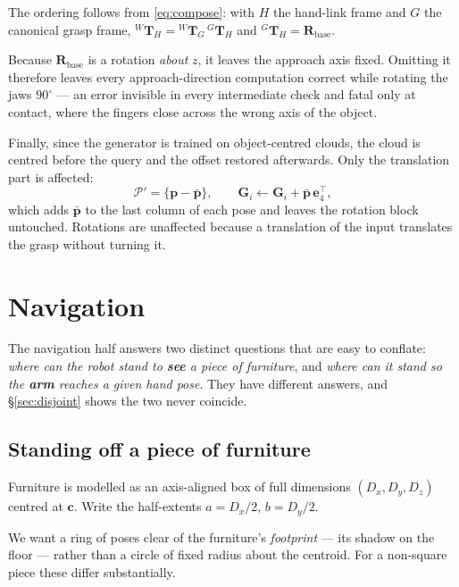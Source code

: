 \documentclass[11pt,a4paper]{article}
\newcommand{\Tf}[2]{{}^{#1}\mathbf{T}_{#2}}
\begin{document}
The ordering follows from \eqref{eq:compose}: with $H$ the hand-link frame and
$G$ the canonical grasp frame, $\Tf{W}{H} = \Tf{W}{G}\,\Tf{G}{H}$ and
$\Tf{G}{H} = \mathbf{R}_{\text{base}}$.

Because $\mathbf{R}_{\text{base}}$ is a rotation \emph{about} $z$, it leaves the
approach axis fixed. Omitting it therefore leaves every approach-direction
computation correct while rotating the jaws $90^\circ$ --- an error invisible in
every intermediate check and fatal only at contact, where the fingers close
across the wrong axis of the object.

Finally, since the generator is trained on object-centred clouds, the cloud is
centred before the query and the offset restored afterwards. Only the
translation part is affected:
\begin{equation}
\mathcal{P}' = \{\mathbf{p} - \bar{\mathbf{p}}\}, \qquad
\mathbf{G}_i \leftarrow \mathbf{G}_i + \bar{\mathbf{p}}\,\mathbf{e}_4^\top,
\end{equation}
which adds $\bar{\mathbf{p}}$ to the last column of each pose and leaves the
rotation block untouched. Rotations are unaffected because a translation of the
input translates the grasp without turning it.

\section{Navigation}

The navigation half answers two distinct questions that are easy to conflate:
\emph{where can the robot stand to \textbf{see} a piece of furniture}, and
\emph{where can it stand so the \textbf{arm} reaches a given hand pose}. They
have different answers, and \S\ref{sec:disjoint} shows the two never coincide.

\subsection{Standing off a piece of furniture}

Furniture is modelled as an axis-aligned box of full dimensions
$(D_x, D_y, D_z)$ centred at $\mathbf{c}$. Write the half-extents
$a = D_x/2$, $b = D_y/2$.

We want a ring of poses clear of the furniture's \emph{footprint} --- its
shadow on the floor --- rather than a circle of fixed radius about the centroid.
For a non-square piece these differ substantially.
\end{document}
